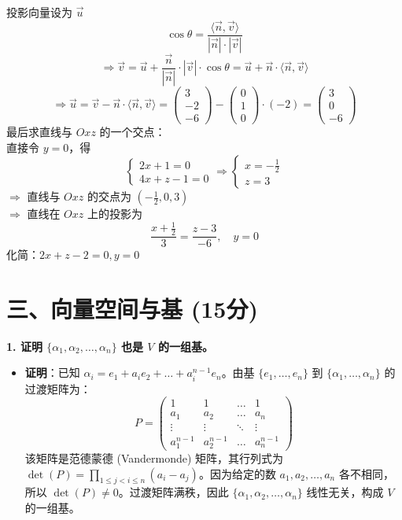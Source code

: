 \documentclass[12pt,a4paper]{article}
\begin{document}
\begin{itemize}
    投影向量设为 $\vec{u}$
    $$ \cos\theta = \frac{\langle \vec{n}, \vec{v} \rangle}{|\vec{n}| \cdot |\vec{v}|} $$
    $$ \Rightarrow \vec{v} = \vec{u} + \frac{\vec{n}}{|\vec{n}|} \cdot |\vec{v}| \cdot \cos\theta = \vec{u} + \vec{n} \cdot \langle \vec{n}, \vec{v} \rangle $$
    $$ \Rightarrow \vec{u} = \vec{v} - \vec{n} \cdot \langle \vec{n}, \vec{v} \rangle = \begin{pmatrix} 3 \\ -2 \\ -6 \end{pmatrix} - \begin{pmatrix} 0 \\ 1 \\ 0 \end{pmatrix} \cdot (-2) = \begin{pmatrix} 3 \\ 0 \\ -6 \end{pmatrix} $$
    最后求直线与 $Oxz$ 的一个交点：\\
    直接令 $y=0$，得
    $$ \begin{cases} 2x + 1 = 0 \\ 4x + z - 1 = 0 \end{cases} \Rightarrow \begin{cases} x = -\frac{1}{2} \\ z = 3 \end{cases} $$
    $\Rightarrow$ 直线与 $Oxz$ 的交点为 $(-\frac{1}{2}, 0, 3)$ \\
    $\Rightarrow$ 直线在 $Oxz$ 上的投影为 
    $$ \frac{x + \frac{1}{2}}{3} = \frac{z - 3}{-6}, \quad y = 0 $$
    化简：$2x + z - 2 = 0, y = 0$
\end{itemize}


\section*{三、向量空间与基 (15分)}

\textbf{1. 证明 $\{\alpha_1, \alpha_2, \dots, \alpha_n\}$ 也是 $V$ 的一组基。}
\begin{itemize}
    \item \textbf{证明}：已知 $\alpha_i = e_1 + a_i e_2 + \dots + a_i^{n-1} e_n$。由基 $\{e_1, \dots, e_n\}$ 到 $\{\alpha_1, \dots, \alpha_n\}$ 的过渡矩阵为：
    $$ P = \begin{pmatrix} 
    1 & 1 & \dots & 1 \\ 
    a_1 & a_2 & \dots & a_n \\ 
    \vdots & \vdots & \ddots & \vdots \\ 
    a_1^{n-1} & a_2^{n-1} & \dots & a_n^{n-1} 
    \end{pmatrix} $$
    该矩阵是范德蒙德 (Vandermonde) 矩阵，其行列式为 $\det(P) = \prod_{1 \le j < i \le n} (a_i - a_j)$。因为给定的数 $a_1, a_2, \dots, a_n$ 各不相同，所以 $\det(P) \neq 0$。过渡矩阵满秩，因此 $\{\alpha_1, \alpha_2, \dots, \alpha_n\}$ 线性无关，构成 $V$ 的一组基。
\end{itemize}
\end{document}
